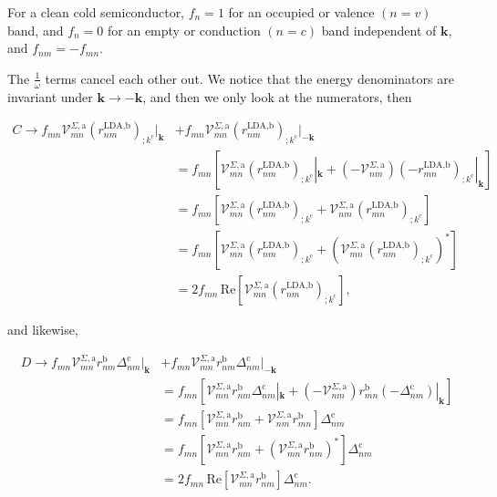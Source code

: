 \documentclass[11pt]{article}
\begin{document}
For a clean cold semiconductor, $f_{n} = 1$ for an occupied or valence $(n = v)$ band, and $f_{n} = 0$ for an empty or conduction $(n = c)$ band independent of $\mathbf{k}$, and $f_{nm}=-f_{mn}$.

The $\frac{1}{\omega}$ terms cancel each other out. We notice that the energy denominators are invariant under $\mathbf{k} \rightarrow - \mathbf{k}$, and then we only look at the numerators, then

\begin{align}\label{ct}
C \rightarrow f_{mn}\mathcal{V}^{\Sigma,\text{a}}_{mn}\left(r^{\text{LDA},\text{b}}_{nm}\right)_{;k^{\text{c}}}|_{\mathbf{k}}
&+ f_{mn}\mathcal{V}^{\Sigma,\text{a}}_{mn}\left(r^{\text{LDA},\text{b}}_{nm}\right)_{;k^{\text{c}}}|_{-\mathbf{k}}\nonumber\\
&= f_{mn}\left[\mathcal{V}^{\Sigma,\text{a}}_{mn}\left(r^{\text{LDA},\text{b}}_{nm}\right)_{;k^{\text{c}}}|_{\mathbf{k}} + \left(-\mathcal{V}^{\Sigma,\text{a}}_{nm}\right)\left(-r^{\text{LDA},\text{b}}_{mn}\right)_{;k^{\text{c}}}|_{\mathbf{k}}\right]\nonumber\\
&= f_{mn}\left[\mathcal{V}^{\Sigma,\text{a}}_{mn}\left(r^{\text{LDA},\text{b}}_{nm}\right)_{;k^{\text{c}}} + \mathcal{V}^{\Sigma,\text{a}}_{nm}\left(r^{\text{LDA},\text{b}}_{mn}\right)_{;k^{\text{c}}}\right]\nonumber\\
&= f_{mn}\left[\mathcal{V}^{\Sigma,\text{a}}_{mn}\left(r^{\text{LDA},\text{b}}_{nm}\right)_{;k^{\text{c}}} + \left(\mathcal{V}^{\Sigma,\text{a}}_{mn}\left(r^{\text{LDA},\text{b}}_{nm}\right)_{;k^{\text{c}}}\right)^*\right]\nonumber\\
&= 2f_{mn}\,\mathrm{Re}\left[\mathcal{V}^{\Sigma,\text{a}}_{mn}\left(r^{\text{LDA},\text{b}}_{nm}\right)_{;k^{\text{c}}}\right],
\end{align}

and likewise,

\begin{align}\label{dt}
D \rightarrow f_{mn}\mathcal{V}^{\Sigma,\text{a}}_{mn}r^{\text{b}}_{nm}\Delta^{\text{c}}_{nm}|_{\mathbf{k}} 
&+ f_{mn}\mathcal{V}^{\Sigma,\text{a}}_{mn}r^{\text{b}}_{nm}\Delta^{\text{c}}_{nm}|_{-\mathbf{k}}\nonumber\\
&= f_{mn}\left[\mathcal{V}^{\Sigma,\text{a}}_{mn}r^{\text{b}}_{nm}\Delta^{\text{c}}_{nm}|_{\mathbf{k}} + \left(-\mathcal{V}^{\Sigma,\text{a}}_{nm}\right)r^{\text{b}}_{mn}\left(-\Delta^{\text{c}}_{nm}\right)|_{\mathbf{k}}\right]\nonumber\\
&= f_{mn}\left[\mathcal{V}^{\Sigma,\text{a}}_{mn}r^{\text{b}}_{nm} + \mathcal{V}^{\Sigma,\text{a}}_{nm}r^{\text{b}}_{mn}\right]\Delta^{\text{c}}_{nm}\nonumber\\
&= f_{mn}\left[\mathcal{V}^{\Sigma,\text{a}}_{mn}r^{\text{b}}_{nm} + \left(\mathcal{V}^{\Sigma,\text{a}}_{mn}r^{\text{b}}_{nm}\right)^*\right]\Delta^{\text{c}}_{nm}\nonumber\\
&= 2f_{mn}\,\mathrm{Re}\left[\mathcal{V}^{\Sigma,\text{a}}_{mn}r^{\text{b}}_{nm}\right]\Delta^{\text{c}}_{nm}.
\end{align}
\end{document}
